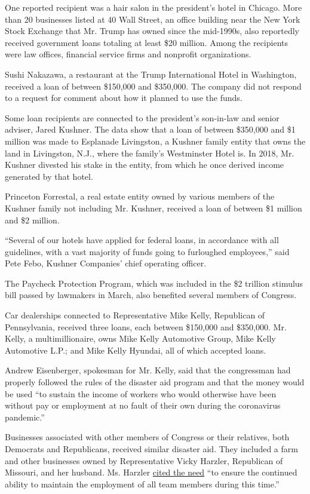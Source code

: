 One reported recipient was a hair salon in the president's hotel in
Chicago. More than 20 businesses listed at 40 Wall Street, an office
building near the New York Stock Exchange that Mr. Trump has owned since
the mid-1990s, also reportedly received government loans totaling at
least \$20 million. Among the recipients were law offices, financial
service firms and nonprofit organizations.

Sushi Nakazawa, a restaurant at the Trump International Hotel in
Washington, received a loan of between \$150,000 and \$350,000. The
company did not respond to a request for comment about how it planned to
use the funds.

Some loan recipients are connected to the president's son-in-law and
senior adviser, Jared Kushner. The data show that a loan of between
\$350,000 and \$1 million was made to Esplanade Livingston, a Kushner
family entity that owns the land in Livingston, N.J., where the family's
Westminster Hotel is. In 2018, Mr. Kushner divested his stake in the
entity, from which he once derived income generated by that hotel.

Princeton Forrestal, a real estate entity owned by various members of
the Kushner family not including Mr. Kushner, received a loan of between
\$1 million and \$2 million.

``Several of our hotels have applied for federal loans, in accordance
with all guidelines, with a vast majority of funds going to furloughed
employees,'' said Pete Febo, Kushner Companies' chief operating officer.

The Paycheck Protection Program, which was included in the \$2 trillion
stimulus bill passed by lawmakers in March, also benefited several
members of Congress.

Car dealerships connected to Representative Mike Kelly, Republican of
Pennsylvania, received three loans, each between \$150,000 and
\$350,000. Mr. Kelly, a multimillionaire, owns Mike Kelly Automotive
Group, Mike Kelly Automotive L.P.; and Mike Kelly Hyundai, all of which
accepted loans.

Andrew Eisenberger, spokesman for Mr. Kelly, said that the congressman
had properly followed the rules of the disaster aid program and that the
money would be used ``to sustain the income of workers who would
otherwise have been without pay or employment at no fault of their own
during the coronavirus pandemic.''

Businesses associated with other members of Congress or their relatives,
both Democrats and Republicans, received similar disaster aid. They
included a farm and other businesses owned by Representative Vicky
Harzler, Republican of Missouri, and her husband. Ms. Harzler
\href{https://hartzler.house.gov/media-center/press-releases/hartzler-small-business-among-47000-missouri-companies-utilize-paycheck}{cited
the need} ``to ensure the continued ability to maintain the employment
of all team members during this time.''

